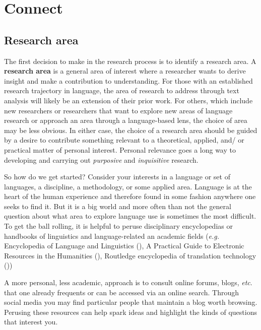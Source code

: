 \documentclass[
  letterpaper,
]{latex/krantz}
\theoremstyle{definition}
\theoremstyle{remark}
\begin{document}
\section{Connect}\label{sec-research-connect}

\subsection{Research area}\label{research-area}

The first decision to make in the research process is to identify a
research area. A \textbf{research area} is a general area of interest
where a researcher wants to derive insight and make a contribution to
understanding. For those with an established research trajectory in
language, the area of research to address through text analysis will
likely be an extension of their prior work. For others, which include
new researchers or researchers that want to explore new areas of
language research or approach an area through a language-based lens, the
choice of area may be less obvious. In either case, the choice of a
research area should be guided by a desire to contribute something
relevant to a theoretical, applied, and/ or practical matter of personal
interest. Personal relevance goes a long way to developing and carrying
out \emph{purposive} and \emph{inquisitive} research.

So how do we get started? Consider your interests in a language or set
of languages, a discipline, a methodology, or some applied area.
Language is at the heart of the human experience and therefore found in
some fashion anywhere one seeks to find it. But it is a big world and
more often than not the general question about what area to explore
language use is sometimes the most difficult. To get the ball rolling,
it is helpful to peruse disciplinary encyclopedias or handbooks of
linguistics and language-related an academic fields (\emph{e.g.}
Encyclopedia of Language and Linguistics
(), A Practical Guide to Electronic
Resources in the Humanities (), Routledge encyclopedia of translation technology
())

A more personal, less academic, approach is to consult online forums,
blogs, \emph{etc}. that one already frequents or can be accessed via an
online search. Through social media you may find particular people that
maintain a blog worth browsing. Perusing these resources can help spark
ideas and highlight the kinds of questions that interest you.
\end{document}
